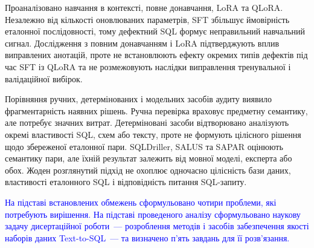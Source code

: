 \documentclass[a4paper,14pt,oneside]{extreport}
\begin{document}
Проаналізовано навчання в контексті, повне донавчання, LoRA та QLoRA. Незалежно від кількості оновлюваних параметрів, SFT збільшує ймовірність еталонної послідовності, тому дефектний SQL формує неправильний навчальний сигнал. Дослідження з повним донавчанням і LoRA підтверджують вплив виправлених анотацій, проте не встановлюють ефекту окремих типів дефектів під час SFT із QLoRA та не розмежовують наслідки виправлення тренувальної і валідаційної вибірок.

Порівняння ручних, детермінованих і модельних засобів аудиту виявило фрагментарність наявних рішень. Ручна перевірка враховує предметну семантику, але потребує значних витрат. Детерміновані засоби відтворювано аналізують окремі властивості SQL, схем або тексту, проте не формують цілісного рішення щодо збереженої еталонної пари. SQLDriller, SALUS та SAPAR оцінюють семантику пари, але їхній результат залежить від мовної моделі, експерта або обох. Жоден розглянутий підхід не охоплює одночасно цілісність бази даних, властивості еталонного SQL і відповідність питання SQL-запиту.

\textcolor{blue}{На підставі встановлених обмежень сформульовано чотири проблеми, які потребують вирішення. На підставі проведеного аналізу сформульовано наукову задачу дисертаційної роботи~--- розроблення методів і засобів забезпечення якості наборів даних Text-to-SQL~--- та визначено п'ять завдань для її розв'язання.}



\end{document}
